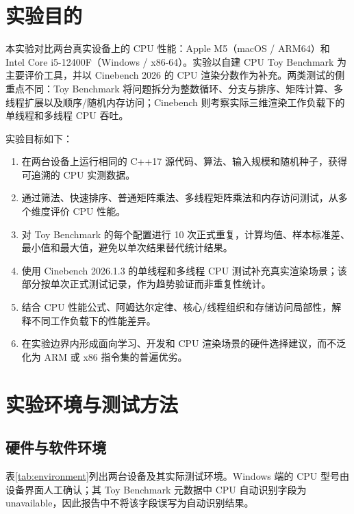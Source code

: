 \documentclass[UTF8,a4paper,12pt]{ctexart}
\begin{document}
\tableofcontents
\newpage

\section{实验目的}

本实验对比两台真实设备上的 CPU 性能：Apple M5（macOS / ARM64）和 Intel Core i5-12400F（Windows / x86-64）。实验以自建 CPU Toy Benchmark 为主要评价工具，并以 Cinebench 2026 的 CPU 渲染分数作为补充。两类测试的侧重点不同：Toy Benchmark 将问题拆分为整数循环、分支与排序、矩阵计算、多线程扩展以及顺序/随机内存访问；Cinebench 则考察实际三维渲染工作负载下的单线程和多线程 CPU 吞吐。

实验目标如下：

\begin{enumerate}
\item 在两台设备上运行相同的 C++17 源代码、算法、输入规模和随机种子，获得可追溯的 CPU 实测数据。
\item 通过筛法、快速排序、普通矩阵乘法、多线程矩阵乘法和内存访问测试，从多个维度评价 CPU 性能。
\item 对 Toy Benchmark 的每个配置进行 10 次正式重复，计算均值、样本标准差、最小值和最大值，避免以单次结果替代统计结果。
\item 使用 Cinebench 2026.1.3 的单线程和多线程 CPU 测试补充真实渲染场景；该部分按单次正式测试记录，作为趋势验证而非重复性统计。
\item 结合 CPU 性能公式、阿姆达尔定律、核心/线程组织和存储访问局部性，解释不同工作负载下的性能差异。
\item 在实验边界内形成面向学习、开发和 CPU 渲染场景的硬件选择建议，而不泛化为 ARM 或 x86 指令集的普遍优劣。
\end{enumerate}

\section{实验环境与测试方法}

\subsection{硬件与软件环境}

表\ref{tab:environment}列出两台设备及其实际测试环境。Windows 端的 CPU 型号由设备界面人工确认；其 Toy Benchmark 元数据中 CPU 自动识别字段为 unavailable，因此报告中不将该字段误写为自动识别结果。
\end{document}
